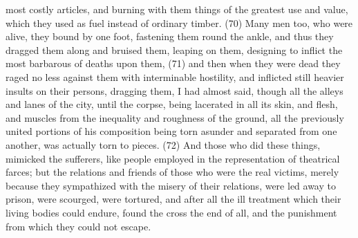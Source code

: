most costly articles, and burning with them things of the greatest use and value, which they used as
fuel instead of ordinary timber. (70) Many men too, who were alive, they bound by one foot,
fastening them round the ankle, and thus they dragged them along and bruised them, leaping on
them, designing to inflict the most barbarous of deaths upon them, (71) and then when they were
dead they raged no less against them with interminable hostility, and inflicted still heavier insults on
their persons, dragging them, I had almost said, though all the alleys and lanes of the city, until the
corpse, being lacerated in all its skin, and flesh, and muscles from the inequality and roughness of
the ground, all the previously united portions of his composition being torn asunder and separated
from one another, was actually torn to pieces. (72) And those who did these things, mimicked the
sufferers, like people employed in the representation of theatrical farces; but the relations and
friends of those who were the real victims, merely because they sympathized with the misery of
their relations, were led away to prison, were scourged, were tortured, and after all the ill treatment
which their living bodies could endure, found the cross the end of all, and the punishment from
which they could not escape.

